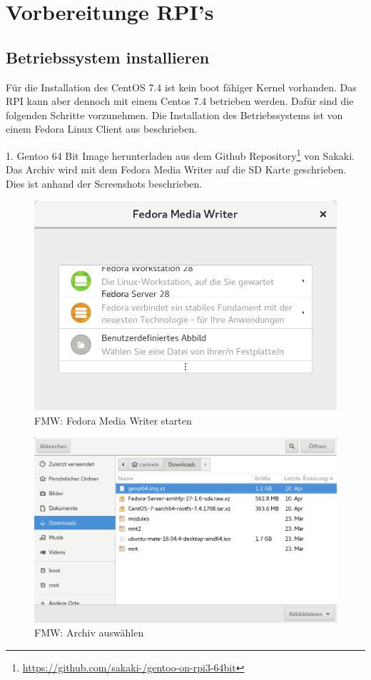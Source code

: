 \section{Vorbereitunge RPI's}
\subsection{Betriebssystem installieren}
Für die Installation des CentOS 7.4 ist kein boot fähiger Kernel vorhanden. Das RPI kann aber dennoch mit einem Centos 7.4 betrieben werden. Dafür sind die folgenden Schritte vorzunehmen. Die Installation des Betriebssystems ist von einem Fedora Linux Client aus beschrieben.

1. Gentoo 64 Bit Image herunterladen aus dem Github Repository\footnote{\url{https://github.com/sakaki-/gentoo-on-rpi3-64bit}} von Sakaki. Das Archiv wird mit dem Fedora Media Writer auf die SD Karte geschrieben. Dies ist anhand der Screenshots beschrieben. \newline
\begin{figure}[H]
	\centering
	\includegraphics[scale=0.3]{Bilder/fmw1.png}
	\caption{FMW: Fedora Media Writer starten}
\end{figure}
\begin{figure}[H]
	\centering
	\includegraphics[scale=0.2]{Bilder/fmw2.png}
	\caption{FMW: Archiv auswählen}
\end{figure}
